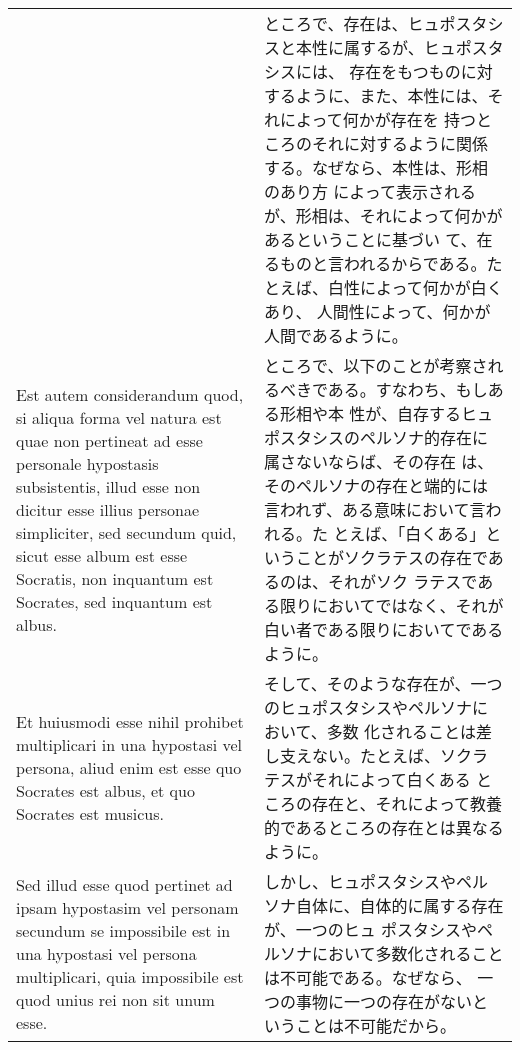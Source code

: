 \documentclass[10pt]{jsarticle} %
\begin{document}
\begin{longtable}{p{21em}p{21em}}
&

ところで、存在は、ヒュポスタシスと本性に属するが、ヒュポスタシスには、
存在をもつものに対するように、また、本性には、それによって何かが存在を
持つところのそれに対するように関係する。なぜなら、本性は、形相のあり方
によって表示されるが、形相は、それによって何かがあるということに基づい
て、在るものと言われるからである。たとえば、白性によって何かが白くあり、
人間性によって、何かが人間であるように。


\\

Est autem considerandum quod, si aliqua forma vel natura est quae non
pertineat ad esse personale hypostasis subsistentis, illud esse non
dicitur esse illius personae simpliciter, sed secundum quid, sicut
esse album est esse Socratis, non inquantum est Socrates, sed
inquantum est albus.


&

ところで、以下のことが考察されるべきである。すなわち、もしある形相や本
性が、自存するヒュポスタシスのペルソナ的存在に属さないならば、その存在
は、そのペルソナの存在と端的には言われず、ある意味において言われる。た
とえば、「白くある」ということがソクラテスの存在であるのは、それがソク
ラテスである限りにおいてではなく、それが白い者である限りにおいてである
ように。


\\

Et huiusmodi esse nihil prohibet multiplicari in una hypostasi vel
persona, aliud enim est esse quo Socrates est albus, et quo Socrates
est musicus.

&

そして、そのような存在が、一つのヒュポスタシスやペルソナにおいて、多数
化されることは差し支えない。たとえば、ソクラテスがそれによって白くある
ところの存在と、それによって教養的であるところの存在とは異なるように。


\\


Sed illud esse quod pertinet ad ipsam hypostasim vel personam secundum
se impossibile est in una hypostasi vel persona multiplicari, quia
impossibile est quod unius rei non sit unum esse.

&

しかし、ヒュポスタシスやペルソナ自体に、自体的に属する存在が、一つのヒュ
ポスタシスやペルソナにおいて多数化されることは不可能である。なぜなら、
一つの事物に一つの存在がないということは不可能だから。


\\


\end{longtable}
\end{document}
